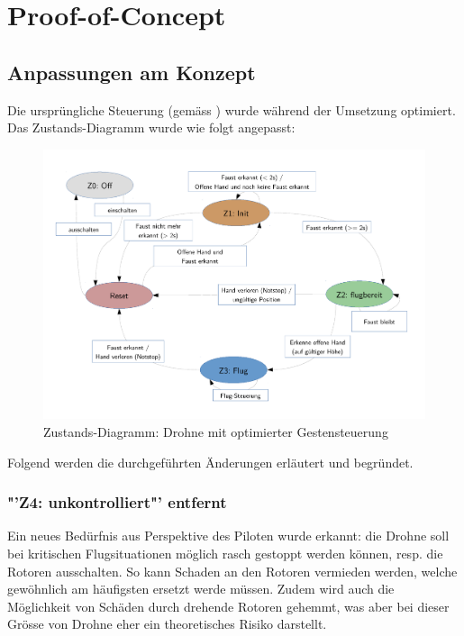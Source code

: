 \chapter{Proof-of-Concept}

\section{Anpassungen am Konzept}
\label{sec:poc:conceptChanges}
Die ursprüngliche Steuerung (gemäss ) wurde während der Umsetzung optimiert.\\
Das Zustands-Diagramm wurde wie folgt angepasst:
\begin{figure}[H]
	\centering
	\includegraphics[width=1.0\textwidth]{figures/concept/state-diagram-2.pdf}
	\caption[Zustands-Diagramm: Drohne mit optimierter Gestensteuerung optimiert]{Zustands-Diagramm: Drohne mit optimierter Gestensteuerung}
\end{figure}

Folgend werden die durchgeführten Änderungen erläutert und begründet.

\subsection{"'Z4: unkontrolliert"' entfernt}
Ein neues Bedürfnis aus Perspektive des Piloten wurde erkannt: die Drohne soll bei kritischen Flugsituationen möglich rasch gestoppt werden können, resp. die Rotoren ausschalten.
So kann Schaden an den Rotoren vermieden werden, welche gewöhnlich am häufigsten ersetzt werde müssen.
Zudem wird auch die Möglichkeit von Schäden durch drehende Rotoren gehemmt, was aber bei dieser Grösse von Drohne eher ein theoretisches Risiko darstellt.

